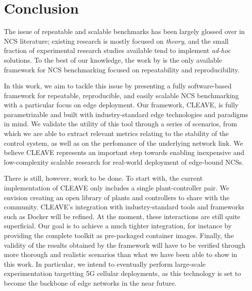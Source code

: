 \section{Conclusion}\label{sec:conclusion}

The issue of repeatable and scalable benchmarks has been largely glossed over in \ac{NCS} literature; existing research is mostly focused on \emph{theory}, and the small fraction of experimental research studies available tend to implement \emph{ad-hoc} solutions.
To the best of our knowledge, the work by \textcite{Zoppi2020NCSBench} is the only available framework for \ac{NCS} benchmarking focused on repeatability and reproducibility.

In this work, we aim to tackle this issue by presenting a fully software-based framework for repeatable, reproducible, and easily scalable \ac{NCS} benchmarking with a particular focus on edge deployment.
Our framework, \ac{CLEAVE}, is fully parametrizable and built with industry-standard edge technologies and paradigms in mind.
We validate the utility of this tool through a series of scenarios, from which we are able to extract relevant metrics relating to the stability of the control system, as well as on the perfomance of the underlying network link.
We believe \ac{CLEAVE} represents an important step towards enabling inexpensive and low-complexity scalable research for real-world deployment of edge-bound \acp{NCS}.

There is still, however, work to be done.
To start with, the current implementation of \ac{CLEAVE} only includes a single plant-controller pair.
We envision creating an open library of plants and controllers to share with the community.
\ac{CLEAVE}'s integration with industry-standard tools and frameworks such as Docker will be refined.
At the moment, these interactions are still quite superficial.
Our goal is to achieve a much tighter integration, for instance by providing the complete toolkit as pre-packaged container images.
Finally, the validity of the results obtained by the framework will have to be verified through more thorough and realistic scenarios than what we have been able to show in this work.
In particular, we intend to eventually perform large-scale experimentation targetting 5G cellular deployments, as this technology is set to become the backbone of edge networks in the near future.

